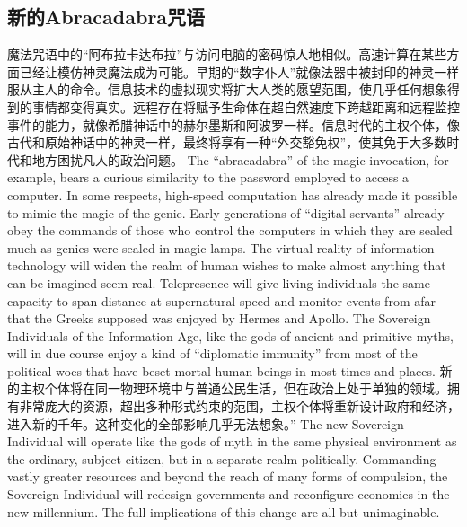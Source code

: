 \subsection{新的Abracadabra咒语}
\begin{paracol}{2}[]
魔法咒语中的“阿布拉卡达布拉”与访问电脑的密码惊人地相似。高速计算在某些方面已经让模仿神灵魔法成为可能。早期的“数字仆人”就像法器中被封印的神灵一样服从主人的命令。信息技术的虚拟现实将扩大人类的愿望范围，使几乎任何想象得到的事情都变得真实。远程存在将赋予生命体在超自然速度下跨越距离和远程监控事件的能力，就像希腊神话中的赫尔墨斯和阿波罗一样。信息时代的主权个体，像古代和原始神话中的神灵一样，最终将享有一种“外交豁免权”，使其免于大多数时代和地方困扰凡人的政治问题。
\switchcolumn
The “abracadabra” of the magic invocation, for example, bears a curious similarity to the password employed to access a computer. In some respects, high-speed computation has already made it possible to mimic the magic of the genie. Early generations of “digital servants” already obey the commands of those who control the computers in which they are sealed much as genies were sealed in magic lamps. The virtual reality of information technology will widen the realm of human wishes to make almost anything that can be imagined seem real. Telepresence will give living individuals the same capacity to span distance at supernatural speed and monitor events from afar that the Greeks supposed was enjoyed by Hermes and Apollo. The Sovereign Individuals of the Information Age, like the gods of ancient and primitive myths, will in due course enjoy a kind of “diplomatic immunity” from most of the political woes that have beset mortal human beings in most times and places.
\switchcolumn*
新的主权个体将在同一物理环境中与普通公民生活，但在政治上处于单独的领域。拥有非常庞大的资源，超出多种形式约束的范围，主权个体将重新设计政府和经济，进入新的千年。这种变化的全部影响几乎无法想象。”
\switchcolumn
The new Sovereign Individual will operate like the gods of myth in the same physical environment as the ordinary, subject citizen, but in a separate realm politically. Commanding vastly greater resources and beyond the reach of many forms of compulsion, the Sovereign Individual will redesign governments and reconfigure economies in the new millennium. The full implications of this change are all but unimaginable.
\end{paracol}

